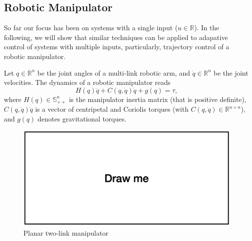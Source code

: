 \documentclass[
]{book}
\theoremstyle{definition}
\theoremstyle{definition}
\theoremstyle{definition}
\theoremstyle{definition}
\theoremstyle{remark}
\begin{document}
\hypertarget{robotic-manipulator}{%
\subsection{Robotic Manipulator}\label{robotic-manipulator}}

So far our focus has been on systems with a single input (\(u \in \mathbb{R}\)). In the following, we will show that similar techniques can be applied to adapative control of systems with multiple inputs, particularly, trajectory control of a robotic manipulator.

Let \(q \in \mathbb{R}^n\) be the joint angles of a multi-link robotic arm, and \(\dot{q} \in \mathbb{R}^n\) be the joint velocities. The dynamics of a robotic manipulator reads
\begin{equation}
H(q) \ddot{q} + C(q,\dot{q})\dot{q} + g(q) = \tau,
\label{eq:ac-mrac-manipulator-dynamics}
\end{equation}
where \(H(q) \in \mathbb{S}^{n}_{++}\) is the manipulator inertia matrix (that is positive definite), \(C(q,\dot{q})\dot{q}\) is a vector of centripetal and Coriolis torques (with \(C(q,\dot{q}) \in \mathbb{R}^{n \times n}\)), and \(g(q)\) denotes gravitational torques.

\begin{figure}

{\centering \includegraphics[width=0.6\linewidth]{images/drawme} 

}

\caption{Planar two-link manipulator}\label{fig:planar-two-link}
\end{figure}
\end{document}
